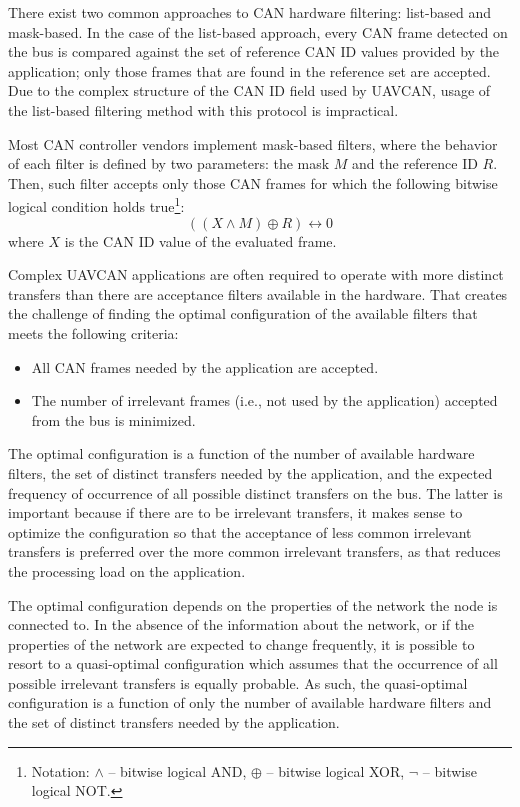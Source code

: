 There exist two common approaches to CAN hardware filtering:
list-based and mask-based.
In the case of the list-based approach, every CAN frame detected on the bus is compared
against the set of reference CAN ID values provided by the application;
only those frames that are found in the reference set are accepted.
Due to the complex structure of the CAN ID field used by UAVCAN,
usage of the list-based filtering method with this protocol is impractical.

Most CAN controller vendors implement mask-based filters,
where the behavior of each filter is defined by two parameters: the mask $M$ and the reference ID $R$.
Then, such filter accepts only those CAN frames for which the following bitwise logical condition holds
true\footnote{Notation: $\land$ -- bitwise logical AND, $\oplus$ -- bitwise logical XOR,
$\neg$ -- bitwise logical NOT.}:
$$((X \land M) \oplus R) \leftrightarrow 0$$
where $X$ is the CAN ID value of the evaluated frame.

Complex UAVCAN applications are often required to operate with more distinct transfers than there are
acceptance filters available in the hardware.
That creates the challenge of finding the optimal configuration of the available filters that meets the
following criteria:
\begin{itemize}
    \item All CAN frames needed by the application are accepted.
    \item The number of irrelevant frames (i.e., not used by the application) accepted from the bus is minimized.
\end{itemize}

The optimal configuration is a function of the number of available hardware filters,
the set of distinct transfers needed by the application,
and the expected frequency of occurrence of all possible distinct transfers on the bus.
The latter is important because if there are to be irrelevant transfers,
it makes sense to optimize the configuration so that the acceptance of less common irrelevant transfers
is preferred over the more common irrelevant transfers, as that reduces the processing load on the application.

The optimal configuration depends on the properties of the network the node is connected to.
In the absence of the information about the network,
or if the properties of the network are expected to change frequently,
it is possible to resort to a quasi-optimal configuration which assumes that
the occurrence of all possible irrelevant transfers is equally probable.
As such, the quasi-optimal configuration is a function of only the number of available hardware filters
and the set of distinct transfers needed by the application.

